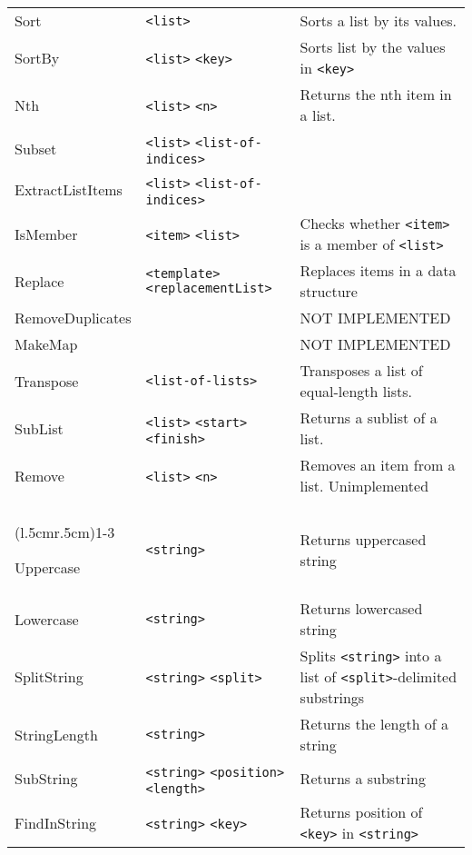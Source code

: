 \begin{longtable}{p{3cm}p{3cm}p{6cm}}
Sort       &\verb+<list>+                    &Sorts a list by its values. \\
SortBy     &\verb+<list>+ \verb+<key>+ & Sorts list by the values in \verb+<key>+ \\
Nth        &\verb+<list>+ \verb+<n>+   &Returns the nth item in a list.\\
Subset     &\verb+<list>+ \verb+<list-of-indices>+ & \\
ExtractListItems&\verb+<list>+ \verb+<list-of-indices>+      & \\
IsMember        &\verb+<item>+ \verb+<list>+ & Checks whether \verb+<item>+ is a member of \verb+<list>+ \\
Replace          &\verb+<template>+ \verb+<replacementList>+ &  Replaces items in a data structure\\
RemoveDuplicates &       &	NOT IMPLEMENTED\\
MakeMap          &       &     	NOT IMPLEMENTED\\
Transpose        &\verb+<list-of-lists>+ &Transposes a list of equal-length lists.\\
SubList          &\verb+<list>+ \verb+<start>+ \verb+<finish>+ & Returns a sublist of a list.\\
Remove           &\verb+<list>+ \verb+<n>+                    &	Removes an item from a list. Unimplemented\\


\addlinespace[0.2cm]
\midrule
\multicolumn{3}{c}{\textbf{String Management Functions}}\\
\cmidrule(l{.5cm}r{.5cm}){1-3}

Uppercase   &\verb+<string>+  &       			Returns uppercased string\\
Lowercase   &\verb+<string>+  &        			Returns lowercased string\\
SplitString &\verb+<string>+ \verb+<split>+ &	Splits \verb+<string>+ into a list of
                             			\verb+<split>+-delimited substrings \\
StringLength&\verb+<string>+                &	Returns the length of a string\\
SubString   &\verb+<string>+ \verb+<position>+ \verb+<length>+&	Returns a substring\\

FindInString&\verb+<string>+ \verb+<key>+ & Returns position of \verb+<key>+ in \verb+<string>+\\


\end{longtable}


